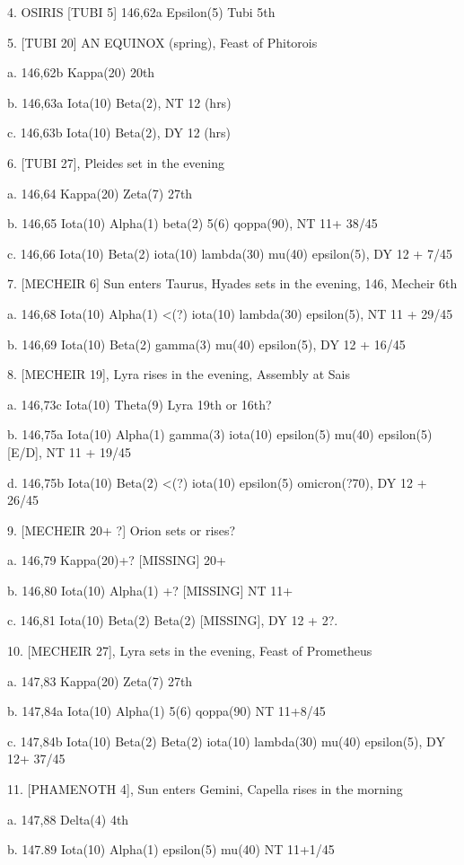 \documentclass[12pt]{article}
\begin{document}
4. OSIRIS [TUBI 5] 146,62a Epsilon(5) Tubi 5th

5. [TUBI 20] AN EQUINOX (spring), Feast of Phitorois

a. 146,62b Kappa(20) 20th

b. 146,63a Iota(10) Beta(2), NT 12 (hrs)

c. 146,63b Iota(10) Beta(2), DY 12 (hrs)

6. [TUBI 27], Pleides set in the evening

a. 146,64 Kappa(20) Zeta(7) 27th

b. 146,65 Iota(10) Alpha(1) beta(2) 5(6) qoppa(90),  NT 11+ 38/45

c. 146,66 Iota(10) Beta(2) iota(10) lambda(30) mu(40) epsilon(5), DY 12 + 7/45

7. [MECHEIR 6] Sun enters Taurus, Hyades sets in the evening, 146, Mecheir 6th

a. 146,68 Iota(10) Alpha(1) <(?) iota(10) lambda(30) epsilon(5), NT 11 + 29/45

b. 146,69 Iota(10) Beta(2) gamma(3) mu(40) epsilon(5),  DY 12 + 16/45

8. [MECHEIR 19], Lyra rises in the evening, Assembly at Sais

a. 146,73c Iota(10) Theta(9) Lyra 19th or 16th?

b. 146,75a Iota(10) Alpha(1) gamma(3) iota(10) epsilon(5) mu(40) epsilon(5) [E/D], NT 11 + 19/45

d. 146,75b Iota(10) Beta(2) <(?) iota(10) epsilon(5) omicron(?70), DY 12 + 26/45

9. [MECHEIR 20+ ?] Orion sets or rises?

a. 146,79 Kappa(20)+? [MISSING] 20+

b. 146,80 Iota(10) Alpha(1) +? [MISSING] NT 11+

c. 146,81 Iota(10) Beta(2) Beta(2) [MISSING], DY 12 + 2?.

10. [MECHEIR 27], Lyra sets in the evening, Feast of Prometheus

a. 147,83 Kappa(20) Zeta(7) 27th

b. 147,84a Iota(10) Alpha(1) 5(6) qoppa(90) NT 11+8/45

c. 147,84b Iota(10) Beta(2) Beta(2) iota(10) lambda(30) mu(40) epsilon(5), DY 12+ 37/45

11. [PHAMENOTH 4], Sun enters Gemini, Capella rises in the morning

a. 147,88 Delta(4) 4th

b. 147.89 Iota(10) Alpha(1) epsilon(5) mu(40) NT 11+1/45
\end{document}
